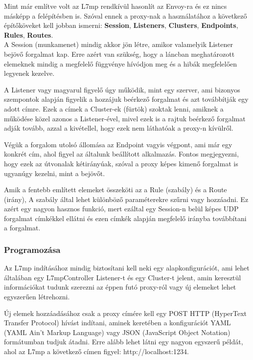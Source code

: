 Mint már említve volt az L7mp rendkívül hasonlít az Envoy-ra és ez nincs másképp 
a felépítésben is. Szóval ennek a proxy-nak a használatához a következő 
építőköveket kell jobban ismerni: \textbf{Session}, \textbf{Listeners}, \textbf{Clusters}, \textbf{Endpoints}, \textbf{Rules}, \textbf{Routes}.\\

A Session (munkamenet) mindig akkor jön létre, amikor valamelyik Listener 
bejövő forgalmat kap. Erre azért van szükség, hogy a láncban meghatározott 
elemeknek mindig a megfelelő függvénye hívódjon meg és a hibák megfelelően 
legyenek kezelve. 

A Listener vagy magyarul figyelő úgy működik, mint egy szerver, ami bizonyos 
szempontok alapján figyelik a hozzájuk beérkező forgalmat és azt továbbítják
egy adott címre. Ezek a címek a Cluster-ek (fürtök) szoktak lenni, amiknek a 
működése közel azonos a Listener-ével, mivel ezek is a rajtuk beérkező forgalmat
adják tovább, azzal a kivétellel, hogy ezek nem láthatóak a proxy-n kívülről.

Végük a forgalom utolsó állomása az Endpoint vagyis végpont, ami már egy konkrét
cím, ahol figyel az általunk beállított alkalmazás. Fontos megjegyezni, hogy 
ezek az útvonalak kétirányúak, szóval a proxy képes kimenő forgalmat is ugyanúgy 
kezelni, mint a bejövőt. 

Amik a fentebb említett elemeket összeköti az a Rule (szabály) és a Route (irány),
A szabály által lehet különböző paraméterekre szűrni vagy hozzáadni. Ez azért egy 
nagyon hasznos funkció, mert ezáltal egy Session-n belül képes UDP forgalmat 
címkékkel ellátni és ezen címkék alapján megfelelő irányba továbbítani a 
forgalmat.

\subsubsection{Programozása}

Az L7mp indításához mindig biztosítani kell neki egy alapkonfigurációt, ami 
lehet általában egy L7mpController Listener-t és egy Cluster-t jelent, amin 
keresztül információkat tudunk szerezni az éppen futó proxy-ról vagy új 
elemeket lehet egyszerűen létrehozni. 

Új elemek hozzáadásához csak a proxy címére kell egy POST HTTP (HyperText Transfer 
Protocol) hívást indítani, aminek keretében a konfigurációt YAML (YAML Ain't Markup 
Language) vagy JSON (JavaScript Object Notation) formátumban tudjuk átadni.
Erre alább lehet látni egy nagyon egyszerű példát, ahol az L7mp a következő címen 
figyel: http://localhost:1234. 

